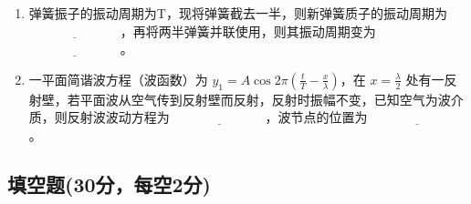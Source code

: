 \begin{enumerate}
        \item 弹簧振子的振动周期为T，现将弹簧截去一半，则新弹簧质子的振动周期为 $\underline{\hspace{3cm}}$，再将两半弹簧并联使用，则其振动周期变为 $\underline{\hspace{3cm}}$。
        
        \item 一平面简谐波方程（波函数）为 $y_1 = A \cos 2 \pi \left( \frac{t}{T} - \frac{x}{\lambda} \right)$，在 $x = \frac{\lambda}{2}$ 处有一反射壁，若平面波从空气传到反射壁而反射，反射时振幅不变，已知空气为波介质，则反射波波动方程为 $\underline{\hspace{3cm}}$，波节点的位置为 $\underline{\hspace{3cm}}$。
    \end{enumerate}
    \subsection{填空题(30分，每空2分)}
